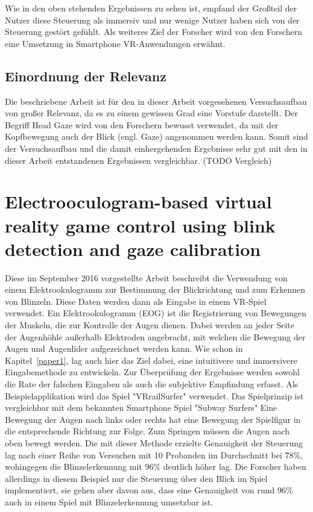 Wie in den oben stehenden Ergebnissen zu sehen ist, empfand der Großteil der Nutzer diese Steuerung als immersiv und nur wenige Nutzer haben sich von der Steuerung gestört gefühlt. Als weiteres Ziel der Forscher wird von den Forschern eine Umsetzung in Smartphone VR-Anwendungen erwähnt.
\subsection{Einordnung der Relevanz}
Die beschriebene Arbeit ist für den in dieser Arbeit vorgesehenen Versuchsaufbau von großer Relevanz, da es zu einem gewissen Grad eine Vorstufe darstellt. Der Begriff Head Gaze wird von den Forschern bewusst verwendet, da mit der Kopfbewegung auch der Blick (engl. Gaze) angenommen werden kann. Somit sind der Versuchsaufbau und die damit einhergehenden Ergebnisse sehr gut mit den in dieser Arbeit entstandenen Ergebnissen vergleichbar. (TODO Vergleich) 

\section{Electrooculogram-based virtual reality game control using blink detection and gaze calibration}
Diese im September 2016 vorgestellte Arbeit beschreibt die Verwendung von einem Elektrookulogramm zur Bestimmung der Blickrichtung und zum Erkennen von Blinzeln. Diese Daten werden dann als Eingabe in einem VR-Spiel verwendet. 
Ein Elektrookulogramm (EOG) ist die Registrierung von Bewegungen der Muskeln, die zur Kontrolle der Augen dienen. Dabei werden an jeder Seite der Augenhöhle außerhalb Elektroden angebracht, mit welchen die Bewegung der Augen und Augenlider aufgezeichnet werden kann. 
Wie schon in Kapitel~\ref{paper1}, lag auch hier das Ziel dabei, eine intuitivere und immersivere Eingabemethode zu entwickeln. Zur Überprüfung der Ergebnisse werden sowohl die Rate der falschen Eingaben als auch die subjektive Empfindung erfasst. Als Beispielapplikation wird das Spiel "VRrailSurfer" verwendet. Das Spielprinzip ist vergleichbar mit dem bekannten Smartphone Spiel "Subway Surfers" Eine Bewegung der Augen nach links oder rechts hat eine Bewegung der Spielfigur in die entsprechende Richtung zur Folge. Zum Springen müssen die Augen nach oben bewegt werden. Die mit dieser Methode erzielte Genauigkeit der Steuerung lag nach einer Reihe von Versuchen mit 10 Probanden im Durchschnitt bei 78\%, wohingegen die Blinzelerkennung mit 96\% deutlich höher lag. Die Forscher haben allerdings in diesem Beispiel nur die Steuerung über den Blick im Spiel implementiert, sie gehen aber davon aus, dass eine Genauigkeit von rund 96\% auch in einem Spiel mit Blinzelerkennung umsetzbar ist. 
